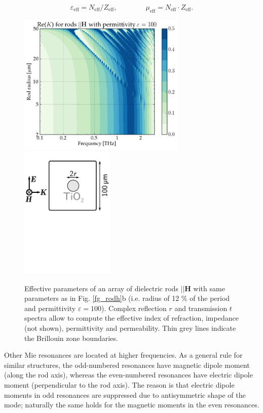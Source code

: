 {\begin{equation} \varepsilon_{\text{eff}} = N_{\text{eff}}/Z_{\text{eff}}, \quad\quad\quad\quad \mu_{\text{eff}} = N_{\text{eff}}\cdot Z_{\text{eff}}.
\label{eq_epsmu}\end{equation}

\begin{figure}[ht]  \caption{Effective parameters of an array of dielectric rods $||\mathbf H$ with same parameters as in Fig. \ref{fg_rodh}b (i.e. radius of  12 \% of the period and permittivity $\varepsilon = 100$). Complex reflection $r$ and transmission $t$ spectra allow to compute the effective index of refraction, impedance (not shown), permittivity and permeability. Thin grey lines indicate the Brillouin zone boundaries.}
\label{fg_rodh_fdtd} \centering 
\includegraphics[width=8cm]{img/old/HRods_eps100_radiusscan.pdf}
\includegraphics[width=4.5cm]{img/HRods_sketch.pdf}
\end{figure}

Other Mie resonances are located at higher frequencies. As a general rule for similar structures, the odd-numbered resonances have magnetic dipole moment (along the rod axis), whereas the even-numbered resonances have electric dipole moment (perpendicular to the rod axis). The reason is that electric dipole moments in odd resonances are suppressed due to antisymmetric shape of the mode; naturally the same holds for the magnetic moments in the even resonances.

}
